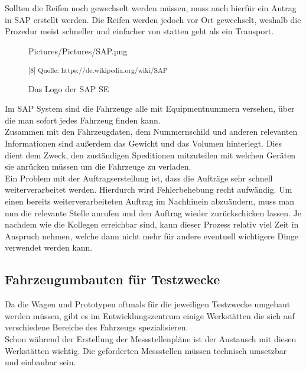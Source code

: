 Sollten die Reifen noch gewechselt werden müssen, muss auch hierfür ein Antrag in SAP erstellt werden. Die Reifen werden jedoch vor Ort gewechselt, weshalb die Prozedur meist schneller und einfacher von statten geht als ein Transport. \\

\begin{figure}[H]
	\begin{center}
		\begin{overpic}[width=\linewidth]{Pictures/Pictures/SAP.png}
			
		\end{overpic}
		
		\caption{Das Logo der SAP SE}
		
		\small\textsuperscript{[8] Quelle: https://de.wikipedia.org/wiki/SAP}
		\label{SAP}
	\end{center}
\end{figure}

Im SAP System sind die Fahrzeuge alle mit Equipmentnummern versehen, über die man sofort jedes Fahrzeug finden kann. \\
Zusammen mit den Fahrzeugdaten, dem Nummernschild und anderen relevanten Informationen sind außerdem das Gewicht und das Volumen hinterlegt. Dies dient dem Zweck, den zuständigen Speditionen mitzuteilen mit welchen Geräten sie anrücken müssen um die Fahrzeuge zu verladen. \\

Ein Problem mit der Auftragserstellung ist, dass die Aufträge sehr schnell weiterverarbeitet werden. Hierdurch wird Fehlerbehebung recht aufwändig. Um einen bereits weiterverarbeiteten Auftrag im Nachhinein abzuändern, muss man nun die relevante Stelle anrufen und den Auftrag wieder zurückschicken lassen. Je nachdem wie die Kollegen erreichbar sind, kann dieser Prozess relativ viel Zeit in Anspruch nehmen, welche dann nicht mehr für andere eventuell wichtigere Dinge verwendet werden kann.\\

\subsection{Fahrzeugumbauten für Testzwecke}

Da die Wagen und Prototypen oftmals für die jeweiligen Testzwecke umgebaut werden müssen, gibt es im Entwicklungszentrum einige Werkstätten die sich auf verschiedene Bereiche des Fahrzeugs spezialisieren. \\
Schon während der Erstellung der Messstellenpläne ist der Austausch mit diesen Werkstätten wichtig. Die geforderten Messstellen müssen technisch umsetzbar und einbaubar sein. \\

